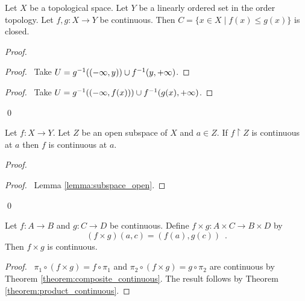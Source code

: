 \begin{lemma}
    \label{lemma:order_topology_closed}
    Let $X$ be a topological space.
    Let $Y$ be a linearly ordered set in the order topology. Let $f, g : X \rightarrow Y$ be continuous. Then $C = \{ x \in X \mid f(x) \leq g(x) \}$ is closed.
\end{lemma}

\begin{proof}
    \pf
    \begin{proof}
        \pf\ Take $U = {g}^{-1}((-\infty, y)) \cup {f}^{-1}(y,+\infty)$.
    \end{proof}
    \begin{proof}
        \pf\ Take $U = {g}^{-1}((-\infty, f(x))) \cup {f}^{-1}(g(x),+\infty)$.
    \end{proof}
    \qed
\end{proof}

\begin{lemma}
    \label{lemma:continuous_open_subspace}
    Let $f : X \rightarrow Y$. Let $Z$ be an open subspace of $X$ and $a \in Z$. If $f \restriction Z$ is continuous at $a$ then $f$ is continuous at $a$.
\end{lemma}

\begin{proof}
    \pf
    \begin{proof}
        \pf\ Lemma \ref{lemma:subspace_open}.
    \end{proof}
    \qed
\end{proof}

\begin{proposition}
    Let $f : A \rightarrow B$ and $g : C \rightarrow D$ be continuous. Define $f \times g : A \times C \rightarrow B \times D$ by
    \[ (f \times g)(a,c) = (f(a), g(c)) \enspace . \]
    Then $f \times g$ is continuous.
\end{proposition}

\begin{proof}
    \pf\ $\pi_1 \circ (f \times g) = f \circ \pi_1$ and $\pi_2 \circ (f \times g) = g \circ \pi_2$ are continuous
    by Theorem \ref{theorem:composite_continuous}. The result follows by Theorem \ref{theorem:product_continuous}.
\end{proof}

